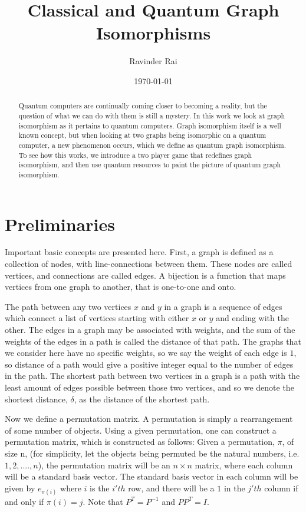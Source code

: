 \documentclass[12pt]{article}
\title{\textbf{Classical and Quantum Graph Isomorphisms}}
\author{Ravinder Rai}
\date{\today}
\begin{document}
 

\maketitle


\begin{abstract}
Quantum computers are continually coming closer to becoming a reality, but the question of what we can do with them is still a mystery. In this work we look at graph isomorphism as it pertains to quantum computers. Graph isomorphism itself is a well known concept, but when looking at two graphs being isomorphic on a quantum computer, a new phenomenon occurs, which we define as quantum graph isomorphism. To see how this works, we introduce a two player game that redefines graph isomorphism, and then use quantum resources to paint the picture of quantum graph isomorphism. 
\end{abstract}

\newpage
\section{Preliminaries} \label{prelim}
Important basic concepts are presented here. First, a graph is defined as a collection of nodes, with line-connections between them. These nodes are called vertices, and connections are called edges. A bijection is a function that maps vertices from one graph to another, that is one-to-one and onto.


The path between any two vertices $x$ and $y$ in a graph is a sequence of edges which connect a list of vertices starting with either $x$ or $y$ and ending with the other. The edges in a graph may be associated with weights, and the sum of the weights of the edges in a path is called the distance of that path. The graphs that we consider here have no specific weights, so we say the weight of each edge is $1$, so distance of a path would give a positive integer equal to the number of edges in the path. The shortest path between two vertices in a graph is a path with the least amount of edges possible between those two vertices, and so we denote the shortest distance, $\delta$, as the distance of the shortest path. 


Now we define a permutation matrix. A permutation is simply a rearrangement of some number of objects. Using a given permutation, one can construct a permutation matrix, which is constructed as follows: Given a permutation, $\pi$, of size n, (for simplicity, let the objects being permuted be the natural numbers, i.e. $1, 2, ...., n$), the permutation matrix will be an $n \times n$ matrix, where each column will be a standard basis vector. The standard basis vector in each column will be given by $e_{\pi(i)}$ where $i$ is the $i'th$ row, and there will be a $1$ in the $j'th$ column if and only if $\pi(i) = j$. Note that $P^T = P^{-1}$ and $PP^T = I$. 
\end{document}
